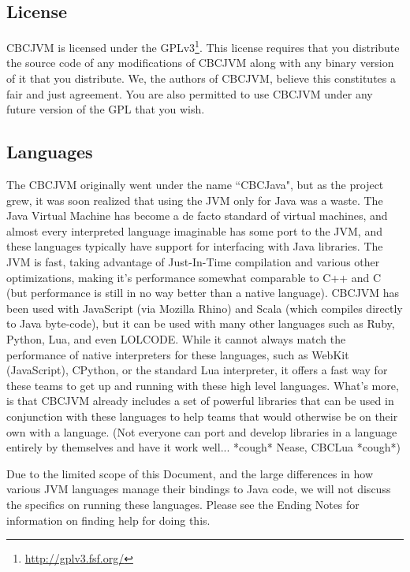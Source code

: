 \documentclass[12pt,letterpaper]{article}
\newcommand{\urlfootnote}[1]{\footnote{\url{#1}}}
\begin{document}
\subsection{License}

CBCJVM is licensed under the GPLv3\urlfootnote{http://gplv3.fsf.org/}. This license requires that you distribute the source code of any modifications of CBCJVM along with any binary version of it that you distribute. We, the authors of CBCJVM, believe this constitutes a fair and just agreement. You are also permitted to use CBCJVM under any future version of the GPL that you wish.



\subsection{Languages}

The CBCJVM originally went under the name ``CBCJava", but as the project grew, it was soon realized that using the JVM only for Java was a waste. The Java Virtual Machine has become a de facto standard of virtual machines, and almost every interpreted language imaginable has some port to the JVM, and these languages typically have support for interfacing with Java libraries. The JVM is fast, taking advantage of Just-In-Time compilation and various other optimizations, making it's performance somewhat comparable to C++ and C (but performance is still in no way better than a native language). CBCJVM has been used with JavaScript (via Mozilla Rhino) and Scala (which compiles directly to Java byte-code), but it can be used with many other languages such as Ruby, Python, Lua, and even LOLCODE. While it cannot always match the performance of native interpreters for these languages, such as WebKit (JavaScript), CPython, or the standard Lua interpreter, it offers a fast way for these teams to get up and running with these high level languages. What's more, is that CBCJVM already includes a set of powerful libraries that can be used in conjunction with these languages to help teams that would otherwise be on their own with a language. (Not everyone can port and develop libraries in a language entirely by themselves and have it work well... *cough* Nease, CBCLua *cough*)

Due to the limited scope of this Document, and the large differences in how various JVM languages manage their bindings to Java code, we will not discuss the specifics on running these languages. Please see the Ending Notes for information on finding help for doing this.
\end{document}
